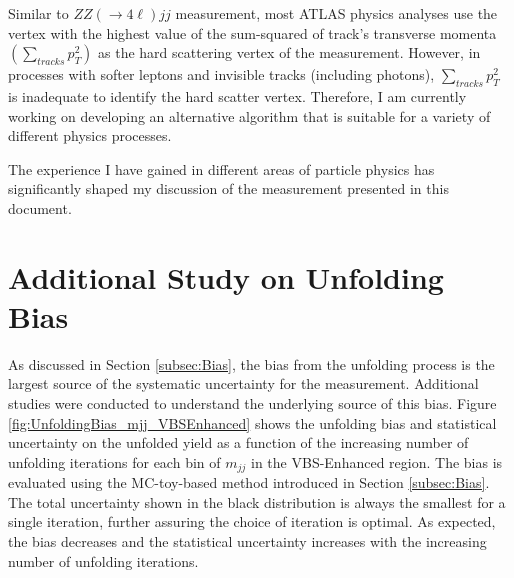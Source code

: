 Similar to $ZZ(\rightarrow 4\ell)jj$ measurement, most ATLAS physics analyses use the vertex with the highest value of the sum-squared of track's transverse momenta $(\sum_{tracks}{p_{T}^2})$ as the hard scattering vertex of the measurement. However, in processes with softer leptons and invisible tracks (including photons), $\sum_{tracks}{p_{T}^2}$ is inadequate to identify the hard scatter vertex. Therefore, I am currently working on developing an alternative algorithm that is suitable for a variety of different physics processes. 

The experience I have gained in different areas of particle physics has significantly shaped my discussion of the measurement presented in this document.  

\section{Additional Study on Unfolding Bias}
\label{Appendix:Unfolding_bias}
As discussed in Section \ref{subsec:Bias}, the bias from the unfolding process is the largest source of the systematic uncertainty for the measurement. Additional studies were conducted to understand the underlying source of this bias. Figure \ref{fig:UnfoldingBias_mjj_VBSEnhanced} shows the unfolding bias and statistical uncertainty on the unfolded yield as a function of the increasing number of unfolding iterations for each bin of $m_{jj}$ in the VBS-Enhanced region. The bias is evaluated using the MC-toy-based method introduced in Section \ref{subsec:Bias}. The total uncertainty shown in the black distribution is always the smallest for a single iteration, further assuring the choice of iteration is optimal. As expected, the bias decreases and the statistical uncertainty increases with the increasing number of unfolding iterations.

